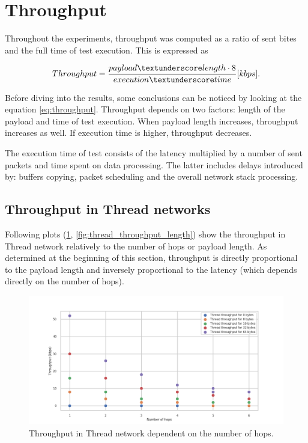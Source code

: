 \newpage
\section{Throughput}
\label{sec:throughput}

Throughout the experiments, throughput was computed as a ratio of sent
bites and the full time of test execution. This is expressed as

\begin{equation}
Throughput = \frac{payload\textunderscore length \cdot 8}{execution\textunderscore time} [kbps].
\label{eq:throughput}
\end{equation}

Before diving into the results, some conclusions can be noticed by
looking at the equation \ref{eq:throughput}. Throughput depends on
two factors: length of the payload and time of test execution.
When payload length increases, throughput increases as well. If 
execution time is higher, throughput decreases.

The execution time of test consists of the latency multiplied by
a number of sent packets and time spent on data processing. The latter
includes delays introduced by: buffers copying, packet scheduling and 
the overall network stack processing.

\subsection{Throughput in Thread networks}

Following plots (\ref{fig:thread_throughput_all}, 
\ref{fig:thread_throughput_length}) show the throughput in Thread 
network relatively to the number of hops or payload length. As
determined at the beginning of this section, throughput is
directly proportional to the payload length and inversely proportional
to the latency (which depends directly on the number of hops).

\begin{figure}[H]
    \centering
    \includegraphics[scale=0.45]{images/Thread_Throughput_all.png}
    \caption{Throughput in Thread network dependent on the number of hops.}
    \label{fig:thread_throughput_all}
\end{figure}

